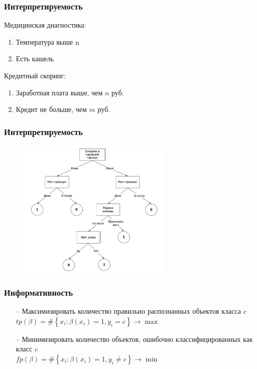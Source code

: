 \documentclass[12pt]{beamer}
\begin{document}
\begin{frame}\frametitle{Интерпретируемость}
Медицинская диагностика:	
	\begin{enumerate} [-]
		\item Температура выше n\degree
		\item Есть кашель
	\end{enumerate}
\vspace{5mm}
Кредитный скоринг:	
	\begin{enumerate} [-]
		\item Заработная плата выше, чем $n$ руб.
		\item Кредит не больше, чем $m$ руб.
	\end{enumerate}
\end{frame}

\begin{frame}\frametitle{Интерпретируемость}
\begin{figure}[htbp]
  \includegraphics[height=190pt, keepaspectratio = true]{images/dtree}   
\end{figure}
\end{frame}

\begin{frame}\frametitle{Информативность}
	\begin{itemize}
		\item[--] Максимизировать количество правильно распознанных объектов класса $c$\\
		${ tp(\beta) = \# \left\{ x_i: \beta(x_i) = 1 , y_i = c \right\} \rightarrow \max }$\\

		\item[--] Минимизировать количество объектов, ошибочно классифицированных как класс $c$\\
		${ fp(\beta) = \# \left\{ x_i: \beta(x_i) = 1 , y_i \neq c \right\} \rightarrow \min }$\\
		
	\end{itemize}
\end{frame}
\end{document}
